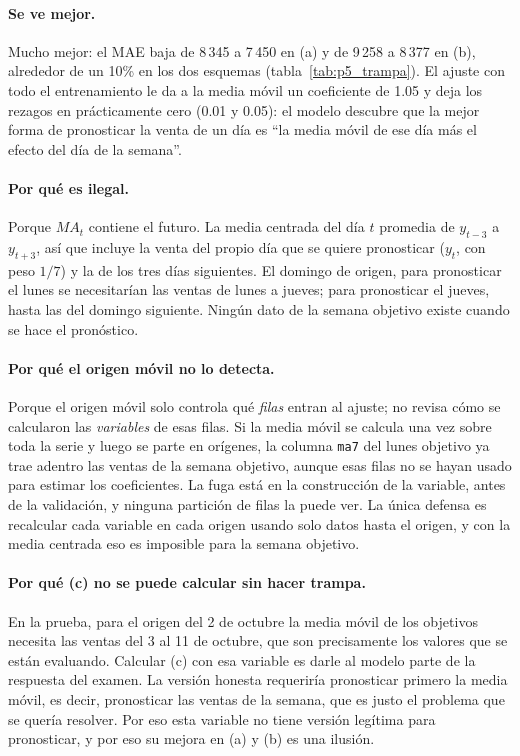 \paragraph{Se ve mejor.} Mucho mejor: el MAE baja de 8\,345 a 7\,450 en (a) y
de 9\,258 a 8\,377 en (b), alrededor de un 10\% en los dos esquemas
(tabla~\ref{tab:p5_trampa}). El ajuste con todo el entrenamiento le da a la
media móvil un coeficiente de 1.05 y deja los rezagos en prácticamente cero
(0.01 y 0.05): el modelo descubre que la mejor forma de pronosticar la venta
de un día es ``la media móvil de ese día más el efecto del día de la semana''.

\paragraph{Por qué es ilegal.} Porque $MA_t$ contiene el futuro. La media
centrada del día $t$ promedia de $y_{t-3}$ a $y_{t+3}$, así que incluye la
venta del propio día que se quiere pronosticar ($y_t$, con peso $1/7$) y la
de los tres días siguientes. El domingo de origen, para pronosticar el lunes
se necesitarían las ventas de lunes a jueves; para pronosticar el jueves,
hasta las del domingo siguiente. Ningún dato de la semana objetivo existe
cuando se hace el pronóstico.

\paragraph{Por qué el origen móvil no lo detecta.} Porque el origen móvil solo
controla qué \emph{filas} entran al ajuste; no revisa cómo se calcularon las
\emph{variables} de esas filas. Si la media móvil se calcula una vez sobre toda
la serie y luego se parte en orígenes, la columna \texttt{ma7} del lunes
objetivo ya trae adentro las ventas de la semana objetivo, aunque esas filas
no se hayan usado para estimar los coeficientes. La fuga está en la
construcción de la variable, antes de la validación, y ninguna partición de
filas la puede ver. La única defensa es recalcular cada variable en cada
origen usando solo datos hasta el origen, y con la media centrada eso es
imposible para la semana objetivo.

\paragraph{Por qué (c) no se puede calcular sin hacer trampa.} En la prueba,
para el origen del 2 de octubre la media móvil de los objetivos necesita las
ventas del 3 al 11 de octubre, que son precisamente los valores que se están
evaluando. Calcular (c) con esa variable es darle al modelo parte de la
respuesta del examen. La versión honesta requeriría pronosticar primero la
media móvil, es decir, pronosticar las ventas de la semana, que es justo el
problema que se quería resolver. Por eso esta variable no tiene versión
legítima para pronosticar, y por eso su mejora en (a) y (b) es una ilusión.

